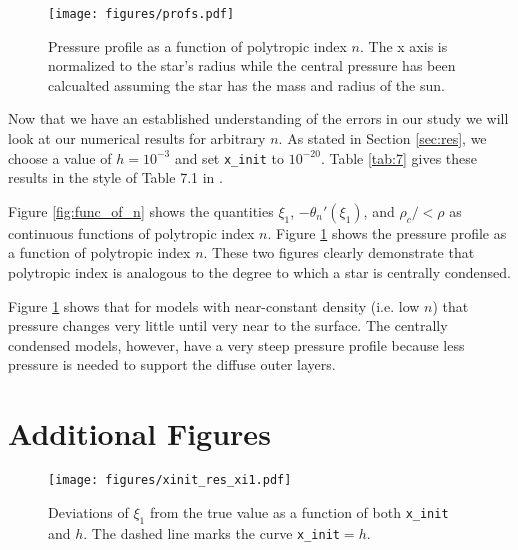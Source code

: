 \documentclass[twocolumn]{aastex631}
\begin{document}
\begin{figure}
    \begin{centering}
        \texttt{[image: figures/profs.pdf]}
        \caption{Pressure profile as a function of polytropic index $n$.
        The x axis is normalized to the star's radius while the central
        pressure has been calcualted assuming the star has the mass
        and radius of the sun.}
        \label{fig:prof}
    \end{centering}
\end{figure}

Now that we have an established understanding of the errors in our study
we will look at our numerical results for arbitrary $n$. As stated in
Section \ref{sec:res}, we choose a value of $h=10^{-3}$ and set 
\texttt{x\_init} to $10^{-20}$. Table \ref{tab:7} gives these results
in the style of Table 7.1 in \citet{textbook}.

Figure \ref{fig:func_of_n} shows the quantities $\xi_1$, $-\theta_n'(\xi_1)$,
and $\rho_c/<\rho$ as continuous functions of polytropic index $n$. Figure 
\ref{fig:prof} shows the pressure profile as a function of
polytropic index $n$. These
two figures clearly demonstrate that polytropic index is analogous to
the degree to which a star is centrally condensed.

Figure \ref{fig:prof} shows that for models with near-constant density
(i.e. low $n$) that pressure changes very little until very near to the surface.
The centrally condensed models, however, have a very steep pressure profile
because less pressure is needed to support the diffuse outer layers.


\appendix

\section{Additional Figures}
\label{sec:figs}
\begin{figure*}[!h]
    \begin{centering}
        \texttt{[image: figures/xinit\_res\_xi1.pdf]}
        \caption{Deviations of $\xi_1$ from the true value as a function
        of both \texttt{x\_init} and $h$. The dashed line
        marks the curve \texttt{x\_init}$=h$.}
        \label{fig:xinit_res_xi1}
    \end{centering}
\end{figure*}










\end{document}
